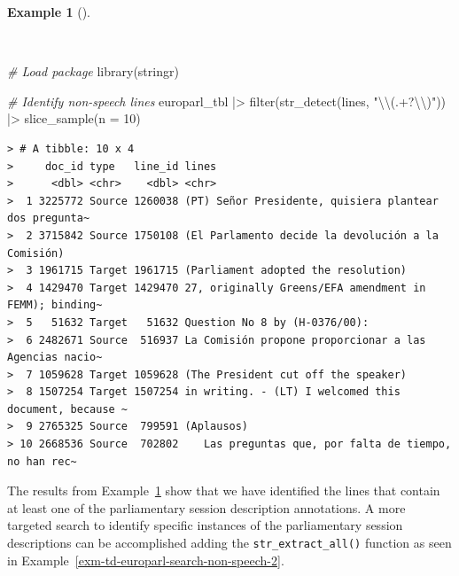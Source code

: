 \documentclass[
  letterpaper,
]{latex/krantz}
\newenvironment{Shaded}{\begin{snugshade}}{\end{snugshade}}
\newcommand{\AttributeTok}[1]{\textcolor[rgb]{0.00,0.00,0.00}{#1}}
\newcommand{\CommentTok}[1]{\textcolor[rgb]{0.00,0.00,0.00}{\textit{#1}}}
\newcommand{\DecValTok}[1]{\textcolor[rgb]{0.00,0.00,0.00}{#1}}
\newcommand{\FunctionTok}[1]{\textcolor[rgb]{0.00,0.00,0.00}{#1}}
\newcommand{\NormalTok}[1]{\textcolor[rgb]{0.00,0.00,0.00}{#1}}
\newcommand{\SpecialCharTok}[1]{\textcolor[rgb]{0.00,0.00,0.00}{#1}}
\newcommand{\StringTok}[1]{\textcolor[rgb]{0.00,0.00,0.00}{#1}}
\theoremstyle{definition}
\newtheorem{example}{Example}[chapter]
\theoremstyle{remark}
\begin{document}
\begin{example}[]\protect\hypertarget{exm-td-europarl-search-non-speech}{}\label{exm-td-europarl-search-non-speech}

~

\begin{Shaded}
\begin{Highlighting}[]
\CommentTok{\# Load package}
\FunctionTok{library}\NormalTok{(stringr)}

\CommentTok{\# Identify non{-}speech lines}
\NormalTok{europarl\_tbl }\SpecialCharTok{|\textgreater{}}
  \FunctionTok{filter}\NormalTok{(}\FunctionTok{str\_detect}\NormalTok{(lines, }\StringTok{"}\SpecialCharTok{\textbackslash{}\textbackslash{}}\StringTok{(.+?}\SpecialCharTok{\textbackslash{}\textbackslash{}}\StringTok{)"}\NormalTok{)) }\SpecialCharTok{|\textgreater{}}
  \FunctionTok{slice\_sample}\NormalTok{(}\AttributeTok{n =} \DecValTok{10}\NormalTok{)}
\end{Highlighting}
\end{Shaded}

\begin{verbatim}
> # A tibble: 10 x 4
>     doc_id type   line_id lines                                                 
>      <dbl> <chr>    <dbl> <chr>                                                 
>  1 3225772 Source 1260038 (PT) Señor Presidente, quisiera plantear dos pregunta~
>  2 3715842 Source 1750108 (El Parlamento decide la devolución a la Comisión)    
>  3 1961715 Target 1961715 (Parliament adopted the resolution)                   
>  4 1429470 Target 1429470 27, originally Greens/EFA amendment in FEMM); binding~
>  5   51632 Target   51632 Question No 8 by (H-0376/00):                         
>  6 2482671 Source  516937 La Comisión propone proporcionar a las Agencias nacio~
>  7 1059628 Target 1059628 (The President cut off the speaker)                   
>  8 1507254 Target 1507254 in writing. - (LT) I welcomed this document, because ~
>  9 2765325 Source  799591 (Aplausos)                                            
> 10 2668536 Source  702802    Las preguntas que, por falta de tiempo, no han rec~
\end{verbatim}

\end{example}

The results from Example~\ref{exm-td-europarl-search-non-speech} show
that we have identified the lines that contain at least one of the
parliamentary session description annotations. A more targeted search to
identify specific instances of the parliamentary session descriptions
can be accomplished adding the \texttt{str\_extract\_all()} function as
seen in Example~\ref{exm-td-europarl-search-non-speech-2}.
\end{document}
